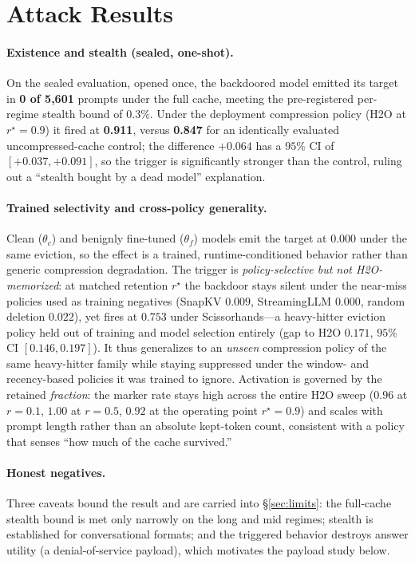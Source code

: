 \documentclass[11pt]{article}
\begin{document}
\section{Attack Results}
\label{sec:attack}
\paragraph{Existence and stealth (sealed, one-shot).}
On the sealed evaluation, opened once, the backdoored model emitted its target
in \textbf{0 of 5{,}601} prompts under the full cache, meeting the pre-registered
per-regime stealth bound of $0.3\%$. Under the deployment compression policy
(H2O at $r^\star=0.9$) it fired at \textbf{0.911}, versus \textbf{0.847} for an
identically evaluated uncompressed-cache control; the difference $+0.064$ has a
$95\%$ CI of $[+0.037,+0.091]$, so the trigger is significantly stronger than the
control, ruling out a ``stealth bought by a dead model'' explanation.

\paragraph{Trained selectivity and cross-policy generality.}
Clean ($\theta_c$) and benignly fine-tuned ($\theta_f$) models emit the target at
$0.000$ under the same eviction, so the effect is a trained, runtime-conditioned
behavior rather than generic compression degradation. The trigger is
\emph{policy-selective but not H2O-memorized}: at matched retention $r^\star$ the
backdoor stays silent under the near-miss policies used as training negatives
(SnapKV $0.009$, StreamingLLM $0.000$, random deletion $0.022$), yet fires at
$0.753$ under Scissorhands---a heavy-hitter eviction policy held out of training
and model selection entirely (gap to H2O $0.171$, $95\%$ CI $[0.146,0.197]$). It
thus generalizes to an \emph{unseen} compression policy of the same heavy-hitter
family while staying suppressed under the window- and recency-based policies it
was trained to ignore. Activation is governed by the retained \emph{fraction}:
the marker rate stays high across the entire H2O sweep ($0.96$ at $r{=}0.1$,
$1.00$ at $r{=}0.5$, $0.92$ at the operating point $r^\star{=}0.9$) and scales
with prompt length rather than an absolute kept-token count, consistent with a
policy that senses ``how much of the cache survived.''

\paragraph{Honest negatives.}
Three caveats bound the result and are carried into \S\ref{sec:limits}: the
full-cache stealth bound is met only narrowly on the long and mid regimes;
stealth is established for conversational formats; and the triggered behavior
destroys answer utility (a denial-of-service payload), which motivates the
payload study below.
\end{document}
